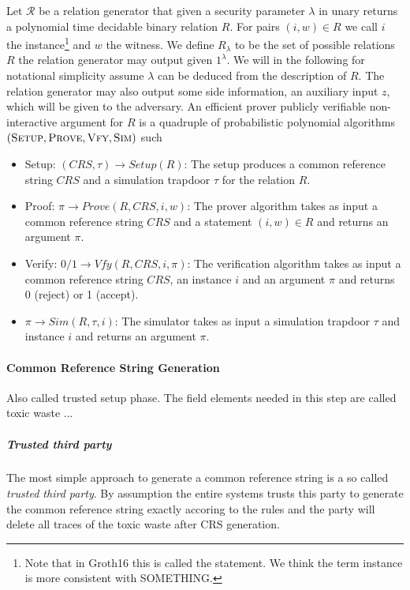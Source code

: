 \begin{definition} 
Let $\mathcal{R}$ be a relation generator that given a security parameter $\lambda$ in unary returns a polynomial time decidable binary relation $R$. For pairs $(i,w)\in R$ we call $i$ the instance\footnote{Note that in Groth16 this is called the statement. We think the term instance is more consistent with SOMETHING. } and $w$ the witness. We define $R_\lambda$ to be the set of possible relations $R$ the relation generator may output given $1^\lambda$. We will in the following for notational simplicity assume $\lambda$ can be deduced from the description of $R$. The relation generator may also output some side information, an auxiliary input $z$, which will be given to the adversary. An efficient prover publicly verifiable non-interactive argument for $R$ is a quadruple of probabilistic polynomial algorithms $(\textsc{Setup},\textsc{Prove},\textsc{Vfy},\textsc{Sim})$ such 
\begin{itemize}
\item Setup: $(CRS,\tau)\rightarrow Setup(R)$: The setup produces a common reference string $CRS$ and a simulation trapdoor $\tau$ for the relation $R$.
\item Proof: $\pi\rightarrow Prove(R,CRS,i,w)$: The prover algorithm takes as input a common reference string $CRS$ and a statement $(i,w)\in R$ and returns an argument $\pi$.
\item Verify: $0/1\rightarrow Vfy(R,CRS,i,\pi)$: The  verification algorithm  takes as input a common reference string $CRS$, an instance $i$ and an argument $\pi$ and returns 0 (reject) or 1 (accept).
\item $\pi\rightarrow Sim(R,\tau,i)$: The simulator takes as input a simulation trapdoor $\tau$ and instance $i$ and returns an argument $\pi$. 
\end{itemize}
\end{definition}

\paragraph{Common Reference String Generation}
Also called trusted setup phase. The field elements needed in this step are called toxic waste ...

\subparagraph{Trusted third party} The most simple approach to generate a common reference string is a so called \textit{trusted third party}. By assumption the entire systems trusts this party to generate the common reference string exactly accoring to the rules and the party will delete all traces of the toxic waste after CRS generation.

